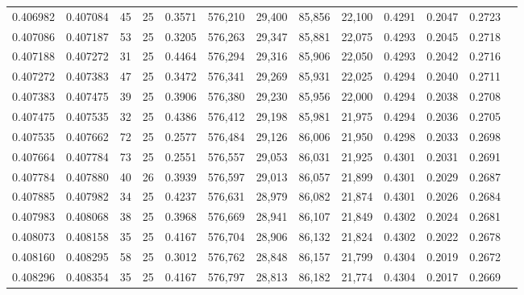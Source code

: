 \begin{tabular}{rrrrrrrrrrrrr}
0.406982 & 0.407084 &    45 &  25 &                                     0.3571 & 576,210 &  29,400 &  85,856 &  22,100 & 0.4291 & 0.2047 & 0.2723 \\
0.407086 & 0.407187 &    53 &  25 &                                     0.3205 & 576,263 &  29,347 &  85,881 &  22,075 & 0.4293 & 0.2045 & 0.2718 \\
0.407188 & 0.407272 &    31 &  25 &                                     0.4464 & 576,294 &  29,316 &  85,906 &  22,050 & 0.4293 & 0.2042 & 0.2716 \\
0.407272 & 0.407383 &    47 &  25 &                                     0.3472 & 576,341 &  29,269 &  85,931 &  22,025 & 0.4294 & 0.2040 & 0.2711 \\
0.407383 & 0.407475 &    39 &  25 &                                     0.3906 & 576,380 &  29,230 &  85,956 &  22,000 & 0.4294 & 0.2038 & 0.2708 \\
0.407475 & 0.407535 &    32 &  25 &                                     0.4386 & 576,412 &  29,198 &  85,981 &  21,975 & 0.4294 & 0.2036 & 0.2705 \\
0.407535 & 0.407662 &    72 &  25 &                                     0.2577 & 576,484 &  29,126 &  86,006 &  21,950 & 0.4298 & 0.2033 & 0.2698 \\
0.407664 & 0.407784 &    73 &  25 &                                     0.2551 & 576,557 &  29,053 &  86,031 &  21,925 & 0.4301 & 0.2031 & 0.2691 \\
0.407784 & 0.407880 &    40 &  26 &                                     0.3939 & 576,597 &  29,013 &  86,057 &  21,899 & 0.4301 & 0.2029 & 0.2687 \\
0.407885 & 0.407982 &    34 &  25 &                                     0.4237 & 576,631 &  28,979 &  86,082 &  21,874 & 0.4301 & 0.2026 & 0.2684 \\
0.407983 & 0.408068 &    38 &  25 &                                     0.3968 & 576,669 &  28,941 &  86,107 &  21,849 & 0.4302 & 0.2024 & 0.2681 \\
0.408073 & 0.408158 &    35 &  25 &                                     0.4167 & 576,704 &  28,906 &  86,132 &  21,824 & 0.4302 & 0.2022 & 0.2678 \\
0.408160 & 0.408295 &    58 &  25 &                                     0.3012 & 576,762 &  28,848 &  86,157 &  21,799 & 0.4304 & 0.2019 & 0.2672 \\
0.408296 & 0.408354 &    35 &  25 &                                     0.4167 & 576,797 &  28,813 &  86,182 &  21,774 & 0.4304 & 0.2017 & 0.2669 \\

\end{tabular}
